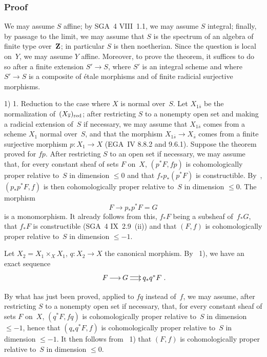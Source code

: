 \subsubsection*{Proof}
We may assume $S$ affine; by SGA~4 VIII~1.1, we may
assume $S$ integral; finally, by passage to the limit, we may
assume that $S$ is the spectrum of an algebra of finite type over~$\mathbf{Z}$; in particular $S$ is then noetherian. Since the question
is local on~$Y$, we may assume $Y$ affine. Moreover, to prove the
theorem, it suffices to do so after a
finite extension $S'\to S$, where $S'$ is an integral scheme
and where $S'\to S$ is a composite of \'etale morphisms and of
finite radicial surjective morphisms.


1) 1. Reduction to the case where $X$ is normal over~$S$. Let
$X_{1\overline{s}}$ be the normalization of~$(X_{\overline{s}})_{\mathrm{red}}$;
after restricting $S$ to a nonempty open set and making
a radicial extension of~$S$ if necessary, we may assume that
$X_{1\overline{s}}$ comes from a scheme $X_1$ normal over~$S$, and
that the morphism $X_{1\overline{s}}\to X_{\overline{s}}$ comes from a
finite surjective morphism $p\colon X_1\to X$ (EGA~IV 8.8.2 and
9.6.1). Suppose the theorem proved for
$fp$. After restricting $S$ to an open set if necessary, we may assume
that, for every constant sheaf of sets $F$ on~$X$, $(p^*F,fp)$
is cohomologically proper relative to~$S$ in dimension $\le
0$ and that $f_*p_*(p^*F)$ is
constructible. By~, $(p_*p^*F,f)$ is then
cohomologically proper relative to~$S$ in dimension $\le
0$. The morphism
$$
F \to p_* p^* F=G
$$
is a monomorphism. It already follows from this, $f_*F$ being
a subsheaf of~$f_*G$, that $f_*F$ is constructible (SGA~4
IX~2.9~(ii)) and that $(F,f)$ is cohomologically proper relative
to~$S$ in dimension $\le -1$.

Let $X_2=X_1 \times_{X} X_1$, $q \colon X_2 \to X$ the
canonical morphism. By ~1),
we have an exact sequence
$$
\xymatrix@C=.5cm{F \ar[r] & G \ar@<2pt>[r]\ar@<-2pt>[r] & q_*q^*F }.
$$

By what has just been proved, applied to
$fq$ instead of~$f$, we may assume, after restricting $S$
to a nonempty open set if necessary, that, for every constant sheaf of sets
$F$ on~$X$, $(q^*F,fq)$ is cohomologically proper relative
to~$S$ in dimension $\le -1$, hence that $(q_*q^*F,f)$ is
cohomologically proper relative to~$S$ in dimension $\le
-1$. It then follows from ~1) that $(F,f)$ is
cohomologically proper relative to~$S$ in dimension $\le 0$.

